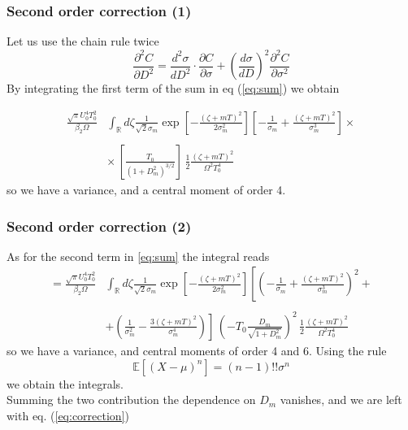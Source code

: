 \documentclass[8pt]{beamer} %
\begin{document}
\begin{frame}
  \frametitle{Second order correction (1)}
  	Let us use the chain rule twice
  \begin{equation}\label{eq:sum}
  	\frac{\partial^{2} C}{\partial D^{2}}=\frac{d^{2} \sigma}{d D^{2}} \cdot \frac{\partial C}{\partial \sigma}+\left(\frac{d \sigma}{d D}\right)^{2} \frac{\partial^{2} C}{\partial \sigma^{2}}
  	\end{equation}
  	By integrating the first term of the sum in eq (\ref{eq:sum}) we obtain

\begin{align}
	\frac{\sqrt{\pi} U_{0}^{4} T_{0}^{2}}{\beta_{2} \Omega} &\int_{\mathbb{R}} d \zeta \frac{1}{\sqrt{2} \sigma_m} \exp \left[-\frac{\left(\zeta+m T\right)^{2}}{2 \sigma_m^{2}}\right] \left[-\frac{1}{\sigma_{m}}+\frac{(\zeta+m T)^2}{\sigma_{m}^{3}}\right] \times\\
	\\ & \times  \,   \left[ \frac{T_0}{\left({1+D_{m}^{2}}\right)^{3/2}}\right] \, \frac{1}{2} \frac{(\zeta+m T)^{2}}{\Omega^{2} T_{0}^{4}}
\end{align}
so we have a variance, and a central moment of order 4.
\end{frame}

\begin{frame}
	\frametitle{Second order correction (2)}
	As for the second term in \ref{eq:sum} the integral reads
	\begin{align}
		=\frac{\sqrt{\pi} U_{0}^{4} T_{0}^{2}}{\beta_{2} \Omega} &\int_{\mathbb{R}} d \zeta \frac{1}{\sqrt{2} \sigma_m} \exp \left[-\frac{\left(\zeta+m T\right)^{2}}{2 \sigma_m^{2}}\right]\left[\left(-\frac{1}{\sigma_m}+\frac{\left(\zeta+m T\right)^{2}}{\sigma_m^{3}}\right)^{2}+\right.\\
		\\ & \left.+\left(\frac{1}{\sigma_m^{2}}-\frac{3(\zeta+m T)^{2}}{\sigma_m^{4}}\right)\right] \, \left(-T_{0} \frac{D_{m}}{\sqrt{1+D_{m}^{2}}}\right)^{2} \, \frac{1}{2} \frac{(\zeta+m T)^{2}}{\Omega^{2} T_{0}^{4}}
	\end{align}
	so we have a variance, and central moments of order 4 and 6.
	Using the rule
	\begin{equation}
		\mathbb{E}[(X-\mu)^n] = (n-1)!! \sigma^n
	\end{equation}
we obtain the integrals.\\
	Summing the two contribution the dependence on $D_m$ vanishes, and we are left with eq. (\ref{eq:correction})
\end{frame}
\end{document}
